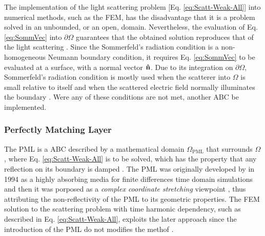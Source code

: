 The implementation of the light scattering problem [Eq. \eqref{eq:Scatt-Weak-All}] into numerical methods, such as the FEM, has the disadvantage that it is a problem solved in an unbounded, or an open, domain. Nevertheless, the evaluation of Eq. \eqref{eq:SommVec} into $\partial\Omega$ guarantees that the obtained solution reproduces that of the light scattering \cite{jin_theory_2010,bondeson_computational_2005}. Since the Sommerfeld's radiation  condition is a non-homogeneous Neumann boundary condition, it  requires Eq. \eqref{eq:SommVec} to be evaluated at a surface, with a normal vector $\vu{n}$. Due to its integration on $\partial\Omega$, Sommerfeld's radiation condition is mostly used when the scatterer into $\Omega$ is small relative to itself and when the scattered electric field normally illuminates the boundary \cite{jin_theory_2010,bondeson_computational_2005}.  Were any of these conditions are not met, another ABC be implemented.

    \subsubsection{Perfectly Matching Layer}

    The PML is a ABC described by a mathematical  domain $\Omega_\text{PML}$ \cite{jin_theory_2010} that surrounds  $\Omega$, where Eq. \eqref{eq:Scatt-Weak-All} is to be solved, which has the property that any reflection on its boundary is damped \cite{bondeson_computational_2005,jin_theory_2010,chew_complex_1997}. The PML was originally developed by \citeauthor{berenger_perfectly_1994} \cite{berenger_perfectly_1994} in 1994 as a highly absorbing media for finite differences time domain simulations and then it was porposed as a \textit{complex coordinate stretching} viewpoint \cite{chew_complex_1997}, thus attributing the non-reflectivity of the PML to its geometric properties. The FEM solution to the scattering problem with time harmonic dependency, such as described in Eq. \eqref{eq:Scatt-Weak-All}, exploits the later approach since the introduction of the PML do not modifies the methof \cite{jin_theory_2010}.


